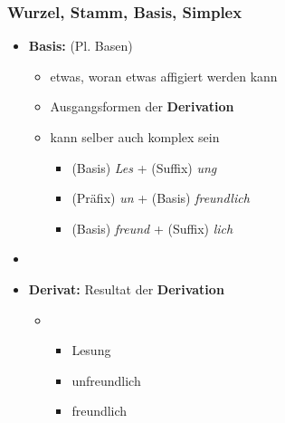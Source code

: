 \begin{frame}
\frametitle{Wurzel, Stamm, Basis, Simplex}

\begin{itemize}
	\item \textbf{Basis:} (Pl. Basen)
	
	\begin{itemize}
		\item etwas, woran etwas affigiert werden kann
		\item Ausgangsformen der \textbf{Derivation}
		\item kann selber auch komplex sein
		
		\begin{itemize}
			\item (Basis) \emph{Les} + (Suffix) \emph{ung}
			\item (Präfix) \emph{un} + (Basis) \emph{freundlich}
			\item (Basis) \emph{freund} + (Suffix) \emph{lich}
		\end{itemize}
	\end{itemize}
	\item[]
	\item \textbf{Derivat:} Resultat der \textbf{Derivation}
	
	\begin{itemize}
		\item[]
		\begin{itemize}
			\item Lesung
			\item unfreundlich
			\item freundlich
		\end{itemize}
	\end{itemize}
\end{itemize}


\end{frame}



